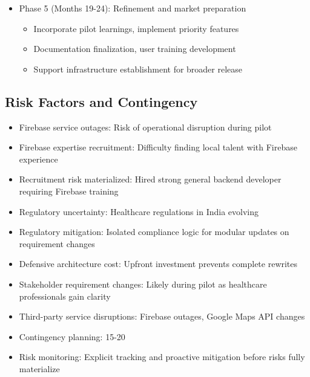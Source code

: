 \documentclass[12pt,a4paper]{report}
\begin{document}
\begin{itemize}
\begin{itemize}
      \item Performance validation under realistic load conditions
      \item User feedback guides refinement and usability
      \item Pilot duration (4-6 months) enables meaningful data collection
    \end{itemize}
  \item Phase 5 (Months 19-24): Refinement and market preparation
    \begin{itemize}
      \item Incorporate pilot learnings, implement priority features
      \item Documentation finalization, user training development
      \item Support infrastructure establishment for broader release
    \end{itemize}
\end{itemize}

\subsection{Risk Factors and Contingency}

\begin{itemize}
  \item Firebase service outages: Risk of operational disruption during pilot
  \item Firebase expertise recruitment: Difficulty finding local talent with Firebase experience
  \item Recruitment risk materialized: Hired strong general backend developer requiring Firebase training
  \item Regulatory uncertainty: Healthcare regulations in India evolving
  \item Regulatory mitigation: Isolated compliance logic for modular updates on requirement changes
  \item Defensive architecture cost: Upfront investment prevents complete rewrites
  \item Stakeholder requirement changes: Likely during pilot as healthcare professionals gain clarity
  \item Third-party service disruptions: Firebase outages, Google Maps API changes
  \item Contingency planning: 15-20%
  \item Risk monitoring: Explicit tracking and proactive mitigation before risks fully materialize
\end{itemize}
\end{document}
